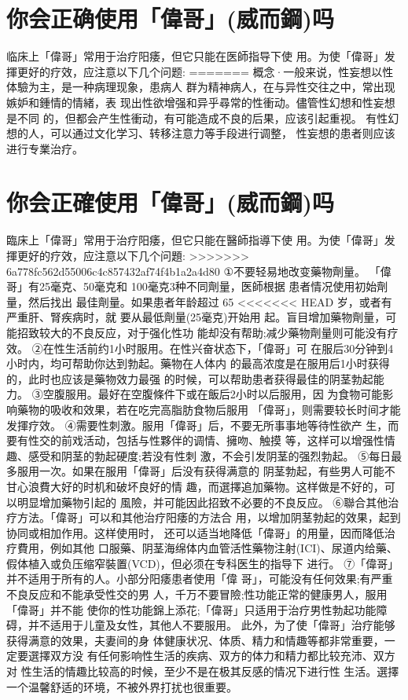 \documentclass[12pt,UTF8]{ctexbook}
\begin{document}
\section{你会正确使用「偉哥」(威而鋼)吗}

临床上「偉哥」常用于治疗阳痿，但它只能在医師指导下使
用。为使「偉哥」发揮更好的疗效，应注意以下几个问题:
=======
概念·一般来说，性妄想以性体驗为主，是一种病理现象，患病人
群为精神病人，在与异性交往之中，常出现嫉妒和鍾情的情緒，表
现出性欲增强和异乎尋常的性衝动。儘管性幻想和性妄想是不同
的，但都会产生性衝动，有可能造成不良的后果，应该引起重视。
有性幻想的人，可以通过文化学习、转移注意力等手段进行调整，
性妄想的患者则应该进行专業治疗。

\section{你会正確使用「偉哥」(威而鋼)吗}

臨床上「偉哥」常用于治疗阳痿，但它只能在醫師指導下使
用。为使「偉哥」发揮更好的疗效，应注意以下几个问題:
>>>>>>> 6a778fc562d55006c4c857432af74f4b1a2a4d80
①不要轻易地改变藥物劑量。
「偉哥」有25毫克、50毫克和
100毫克3种不同劑量，医師根据
患者情况使用初始劑量，然后找出
最佳劑量。如果患者年龄超过 65
<<<<<<< HEAD
岁，或者有严重肝、腎疾病时，就
要从最低劑量(25毫克)开始用
起。盲目增加藥物劑量，可能招致较大的不良反应，对于强化性功
能却没有帮助;减少藥物劑量则可能没有疗效。
②在性生活前约1小时服用。在性兴奋状态下，「偉哥」可
在服后30分钟到4小时内，均可帮助你达到勃起。藥物在人体内
的最高浓度是在服用后1小时获得的，此时也应该是藥物效力最强
的时候，可以帮助患者获得最佳的阴茎勃起能力。
③空腹服用。最好在空腹條件下或在飯后2小时以后服用，因
为食物可能影响藥物的吸收和效果，若在吃完高脂肪食物后服用
「偉哥」，则需要较长时间才能发揮疗效。
④需要性刺激。服用「偉哥」后，不要无所事事地等待性欲产
生，而要有性交的前戏活动，包括与性夥伴的调情、擁吻、触摸
等，这样可以增强性情趣、感受和阴茎的勃起硬度;若没有性刺
激，不会引发阴茎的强烈勃起。
⑤每日最多服用一次。如果在服用「偉哥」后没有获得满意的
阴茎勃起，有些男人可能不甘心浪費大好的时机和破坏良好的情
趣，而選擇追加藥物。这样做是不好的，可以明显增加藥物引起的
風險，并可能因此招致不必要的不良反应。
⑥聯合其他治疗方法。「偉哥」可以和其他治疗阳痿的方法合
用，以增加阴茎勃起的效果，起到协同或相加作用。这样使用时，
还可以适当地降低「偉哥」的用量，因而降低治疗費用，例如其他
口服藥、阴茎海绵体内血管活性藥物注射(ICI)、尿道内给藥、
假体植入或负压缩窄裝置(VCD)，但必须在专科医生的指导下
进行。
⑦「偉哥」并不适用于所有的人。小部分阳痿患者使用「偉
哥」，可能没有任何效果;有严重不良反应和不能承受性交的男
人，千万不要冒險;性功能正常的健康男人，服用「偉哥」并不能
使你的性功能錦上添花;「偉哥」只适用于治疗男性勃起功能障
碍，并不适用于儿童及女性，其他人不要服用。
此外，为了使「偉哥」治疗能够获得满意的效果，夫妻间的身
体健康状况、体质、精力和情趣等都非常重要，一定要選擇双方没
有任何影响性生活的疾病、双方的体力和精力都比较充沛、双方对
性生活的情趣比较高的时候，至少不是在极其反感的情况下进行性
生活。選擇一个温馨舒适的环境，不被外界打扰也很重要。
\end{document}
